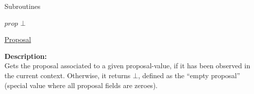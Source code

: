 \documentclass[10pt,a4paper]{article}
\begin{document}
\begin{section}{Subroutines}

        






\begin{algorithm}[H]
    \begin{algorithmic}[1]

        \Return $prop$
    \Else
        \Return $\bot$
    \EndIf

    \EndFunction
    \end{algorithmic}
    \caption{\underline{Proposal}}
\end{algorithm}

\noindent \textbf{Description:}\\ Gets the proposal associated to a given proposal-value, 
if it has been observed in the current context.
Otherwise, it returns $\bot$, defined as the ``empty proposal'' (special value where all
proposal fields are zeroes).


\end{section}
\end{document}
